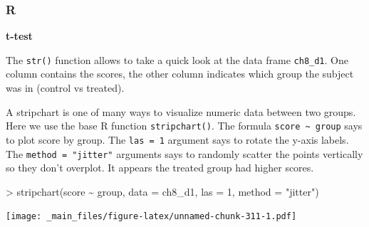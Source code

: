 \documentclass[
]{book}
\newenvironment{Shaded}{\begin{snugshade}}{\end{snugshade}}
\newcommand{\AttributeTok}[1]{\textcolor[rgb]{0.77,0.63,0.00}{#1}}
\newcommand{\DecValTok}[1]{\textcolor[rgb]{0.00,0.00,0.81}{#1}}
\newcommand{\ErrorTok}[1]{\textcolor[rgb]{0.64,0.00,0.00}{\textbf{#1}}}
\newcommand{\FunctionTok}[1]{\textcolor[rgb]{0.00,0.00,0.00}{#1}}
\newcommand{\NormalTok}[1]{#1}
\newcommand{\SpecialCharTok}[1]{\textcolor[rgb]{0.00,0.00,0.00}{#1}}
\newcommand{\StringTok}[1]{\textcolor[rgb]{0.31,0.60,0.02}{#1}}
\begin{document}
\hypertarget{r-47}{%
\subsubsection*{R}\label{r-47}}

\textbf{t-test}

The \texttt{str()} function allows to take a quick look at the data frame \texttt{ch8\_d1}. One column contains the scores, the other column indicates which group the subject was in (control vs treated).

\begin{Shaded}
\end{Shaded}

A stripchart is one of many ways to visualize numeric data between two groups. Here we use the base R function \texttt{stripchart()}. The formula \texttt{score\ \textasciitilde{}\ group} says to plot score by group. The \texttt{las\ =\ 1} argument says to rotate the y-axis labels. The \texttt{method\ =\ "jitter"} arguments says to randomly scatter the points vertically so they don't overplot. It appears the treated group had higher scores.

\begin{Shaded}
\begin{Highlighting}[]
\SpecialCharTok{\textgreater{}} \FunctionTok{stripchart}\NormalTok{(score }\SpecialCharTok{\textasciitilde{}}\NormalTok{ group, }\AttributeTok{data =}\NormalTok{ ch8\_d1, }\AttributeTok{las =} \DecValTok{1}\NormalTok{, }\AttributeTok{method =} \StringTok{"jitter"}\NormalTok{)}
\end{Highlighting}
\end{Shaded}

\texttt{[image: \_main\_files/figure-latex/unnamed-chunk-311-1.pdf]}
\end{document}
